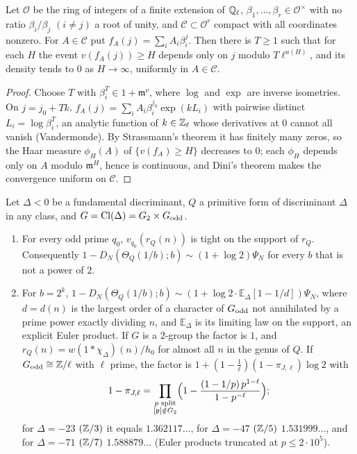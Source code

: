\documentclass[11pt]{article}
\DeclareMathOperator{\Cl}{Cl}
\begin{document}
\begin{lemma}[Strassmann]\label{lem:strassmann}
Let $\mathcal O$ be the ring of integers of a finite extension of $\mathbb Q_\ell$,
$\beta_1,\dots,\beta_r\in\mathcal O^\times$ with no ratio $\beta_i/\beta_j$ $(i\ne j)$ a root of
unity, and $\mathcal C\subset\mathcal O^r$ compact with all coordinates nonzero. For
$A\in\mathcal C$ put $f_A(j)=\sum_iA_i\beta_i^j$. Then there is $T\ge1$ such that for each $H$ the
event $v(f_A(j))\ge H$ depends only on $j$ modulo $T\ell^{a(H)}$, and its density tends to $0$ as
$H\to\infty$, uniformly in $A\in\mathcal C$.
\end{lemma}

\begin{proof}
Choose $T$ with $\beta_i^T\in1+\mathfrak m^\nu$, where $\log$ and $\exp$ are inverse isometries.
On $j=j_0+Tk$, $f_A(j)=\sum_iA_i\beta_i^{j_0}\exp(kL_i)$ with pairwise distinct
$L_i=\log\beta_i^T$, an analytic function of $k\in\mathbb Z_\ell$ whose derivatives at $0$ cannot all
vanish (Vandermonde). By Strassmann's theorem \cite{Strassmann1928} it has finitely many zeros,
so the Haar measure $\phi_H(A)$ of $\{v(f_A)\ge H\}$ decreases to $0$; each $\phi_H$ depends only
on $A$ modulo $\mathfrak m^H$, hence is continuous, and Dini's theorem makes the convergence
uniform on $\mathcal C$.
\end{proof}

\begin{theorem}\label{thm:classgroups}
Let $\Delta<0$ be a fundamental discriminant, $Q$ a primitive form of discriminant $\Delta$ in any
class, and $G=\Cl(\Delta)=G_2\times G_{\rm odd}$.
\begin{enumerate}[label=\textup{(\alph*)},nosep]
\item For every odd prime $q_0$, $v_{q_0}(r_Q(n))$ is tight on the support of $r_Q$.
Consequently $1-D_N(\Theta_Q(1/b);b)\sim(1+\log2)\Psi_N$ for every $b$ that is not a power of $2$.
\item For $b=2^k$, $1-D_N(\Theta_Q(1/b);b)\sim(1+\log2\cdot\mathbb E_\Delta[1-1/d])\Psi_N$, where
$d=d(n)$ is the largest order of a character of $G_{\rm odd}$ not annihilated by a prime power
exactly dividing $n$, and $\mathbb E_\Delta$ is its limiting law on the support, an explicit Euler
product. If $G$ is a $2$-group the factor is $1$, and $r_Q(n)=w(1*\chi_\Delta)(n)/h_0$ for almost
all $n$ in the genus of $Q$. If $G_{\rm odd}\cong\mathbb Z/\ell$ with $\ell$ prime, the factor is
$1+(1-\frac1\ell)(1-\pi_{J,\ell})\log2$ with
\[
1-\pi_{J,\ell}=\prod_{\substack{p\text{ split}\\ [\mathfrak p]\notin G_2}}\Bigl(1-\frac{(1-1/p)\,p^{1-\ell}}{1-p^{-\ell}}\Bigr);
\]
for $\Delta=-23$ $(\mathbb Z/3)$ it equals $1.362117\ldots$, for $\Delta=-47$ $(\mathbb Z/5)$ $1.531999\ldots$,
and for $\Delta=-71$ $(\mathbb Z/7)$ $1.588879\ldots$ (Euler products truncated at $p\le2\cdot10^5$).
\end{enumerate}
\end{theorem}
\end{document}
